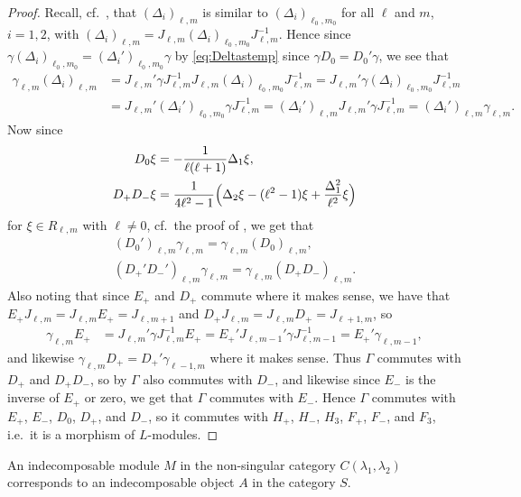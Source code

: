\begin{proof}
  Recall, cf.\ , that $(\Delta_i)_{\ell,m}$ is similar to $(\Delta_i)_{\ell_0,m_0}$ for all $\ell$ and $m$, $i=1,2$, with $(\Delta_i)_{\ell,m} = J_{\ell,m}(\Delta_i)_{\ell_0,m_0}J_{\ell,m}^{-1}$. Hence since $\gamma (\Delta_i)_{\ell_0,m_0} = (\Delta_i')_{\ell_0,m_0}\gamma$ by \cref{eq:Deltastemp} since $\gamma D_0 = D_0' \gamma$, we see that
  \begin{align*}
    \gamma_{\ell,m} (\Delta_i)_{\ell,m} &= J_{\ell,m}' \gamma J_{\ell,m}^{-1}J_{\ell,m}(\Delta_i)_{\ell_0,m_0}J_{\ell,m}^{-1} = J_{\ell,m}' \gamma (\Delta_i)_{\ell_0,m_0}J_{\ell,m}^{-1} \\
    &= J_{\ell,m}' (\Delta_i')_{\ell_0,m_0} \gamma J_{\ell,m}^{-1} = (\Delta_i')_{\ell,m} J_{\ell,m}'\gamma J_{\ell,m}^{-1} = (\Delta_i')_{\ell,m} \gamma_{\ell,m}.
  \end{align*}
  Now since
  \begin{align*}
    D_0 \xi &= -\dfrac{1}{\ell(\ell+1)} \Delta_1\xi,\\
    D_+D_- \xi &= \dfrac{1}{4\ell^2-1}\Bigl( \Delta_2\xi - (\ell^2-1)\xi + \dfrac{\Delta_1^2}{\ell^2}\xi \Bigr)
  \end{align*}
  for $\xi \in R_{\ell,m}$ with $\ell\neq 0$, cf.\ the proof of , we get that
  \begin{align*}
    (D_0')_{\ell,m}\gamma_{\ell,m} = \gamma_{\ell,m}(D_0)_{\ell,m},\\
    (D_+'D_-')_{\ell,m}\gamma_{\ell,m} = \gamma_{\ell,m} (D_+D_-)_{\ell,m}.
  \end{align*}
  Also noting that since $E_+$ and $D_+$ commute where it makes sense, we have that $E_+J_{\ell,m}=J_{\ell,m}E_+=J_{\ell,m+1}$ and $D_+J_{\ell,m}=J_{\ell,m}D_+=J_{\ell+1,m}$, so
  \begin{align*}
    \gamma_{\ell,m} E_+ &= J_{\ell,m}' \gamma J_{\ell,m}^{-1} E_+ = E_+'J_{\ell,m-1}' \gamma J_{\ell,m-1}^{-1} = E_+'\gamma_{\ell,m-1},
  \end{align*}
  and likewise $\gamma_{\ell,m}D_+ = D_+'\gamma_{\ell-1,m}$ where it makes sense. Thus $\Gamma$ commutes with $D_+$ and $D_+D_-$, so by  $\Gamma$ also commutes with $D_-$, and likewise since $E_-$ is the inverse of $E_+$ or zero, we get that $\Gamma$ commutes with $E_-$. Hence $\Gamma$ commutes with $E_+$, $E_-$, $D_0$, $D_+$, and $D_-$, so it commutes with $H_+$, $H_-$, $H_3$, $F_+$, $F_-$, and $F_3$, i.e.\ it is a morphism of $L$-modules.
\end{proof}

\begin{corollary}
  An indecomposable module $M$ in the non-singular category $C(\lambda_1,\lambda_2)$ corresponds to an indecomposable object $A$ in the category $S$.
\end{corollary}

